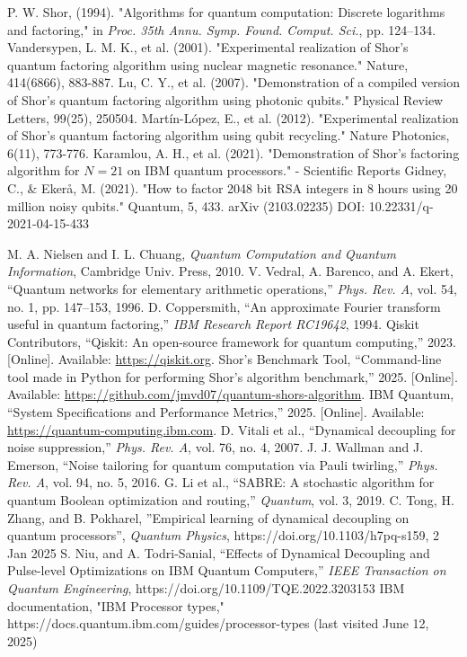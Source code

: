 \documentclass[conference,twoside]{IEEEtran}
\begin{document}
\begin{thebibliography}{0,5}
P. W. Shor, (1994). "Algorithms for quantum computation: Discrete logarithms and factoring," in \textit{Proc. 35th Annu. Symp. Found. Comput. Sci.}, pp. 124--134.
Vandersypen, L. M. K., et al. (2001). "Experimental realization of Shor's quantum factoring algorithm using nuclear magnetic resonance." Nature, 414(6866), 883-887.
Lu, C. Y., et al. (2007). "Demonstration of a compiled version of Shor's quantum factoring algorithm using photonic qubits." Physical Review Letters, 99(25), 250504.
Martín-López, E., et al. (2012). "Experimental realization of Shor's quantum factoring algorithm using qubit recycling." Nature Photonics, 6(11), 773-776.
Karamlou, A. H., et al. (2021). "Demonstration of Shor's factoring algorithm for $N = 21 $ on IBM quantum processors." - Scientific Reports
Gidney, C., & Ekerå, M. (2021). "How to factor 2048 bit RSA integers in 8 hours using 20 million noisy qubits." Quantum, 5, 433. arXiv (2103.02235) DOI: 10.22331/q-2021-04-15-433


M. A. Nielsen and I. L. Chuang, \textit{Quantum Computation and Quantum Information}, Cambridge Univ. Press, 2010.
V. Vedral, A. Barenco, and A. Ekert, ``Quantum networks for elementary arithmetic operations,'' \textit{Phys. Rev. A}, vol. 54, no. 1, pp. 147--153, 1996.
D. Coppersmith, ``An approximate Fourier transform useful in quantum factoring,'' \textit{IBM Research Report RC19642}, 1994.
Qiskit Contributors, ``Qiskit: An open-source framework for quantum computing,'' 2023. [Online]. Available: \url{https://qiskit.org}.
Shor's Benchmark Tool, ``Command-line tool made in Python for performing Shor's algorithm benchmark,'' 2025. [Online]. Available: \url{https://github.com/jmvd07/quantum-shors-algorithm}.
IBM Quantum, ``System Specifications and Performance Metrics,'' 2025. [Online]. Available: \url{https://quantum-computing.ibm.com}.
D. Vitali et al., ``Dynamical decoupling for noise suppression,'' \textit{Phys. Rev. A}, vol. 76, no. 4, 2007.
J. J. Wallman and J. Emerson, ``Noise tailoring for quantum computation via Pauli twirling,'' \textit{Phys. Rev. A}, vol. 94, no. 5, 2016.
G. Li et al., ``SABRE: A stochastic algorithm for quantum Boolean optimization and routing,'' \textit{Quantum}, vol. 3, 2019.
C. Tong, H. Zhang, and B. Pokharel, ''Empirical learning of dynamical decoupling on quantum processors'', \textit{Quantum Physics}, https://doi.org/10.1103/h7pq-s159, 2 Jan 2025  
S. Niu, and A. Todri-Sanial, ``Effects of Dynamical Decoupling and Pulse-level Optimizations on IBM Quantum Computers,'' \textit{IEEE Transaction on Quantum Engineering}, 
https://doi.org/10.1109/TQE.2022.3203153
IBM documentation, "IBM Processor types," https://docs.quantum.ibm.com/guides/processor-types (last visited June 12, 2025)
\end{thebibliography}
\end{document}
